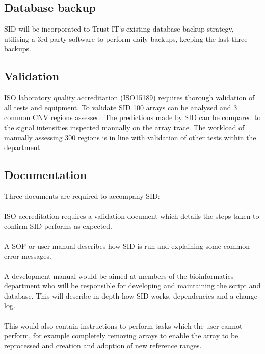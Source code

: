 \subsection{Database backup}
SID will be incorporated to Trust IT`s existing database backup strategy, utilising a 3rd party software to perform daily backups, keeping the last three backups. 

\subsection{Validation}
ISO laboratory quality accreditation (ISO15189) requires thorough validation of all tests and equipment. To validate SID 100 arrays can be analysed and 3 common CNV regions assessed. The predictions made by SID can be compared to the signal intensities inspected manually on the array trace. The workload of manually assessing 300 regions is in line with validation of other tests within the department.

\subsection{Documentation}
Three documents are required to accompany SID:
\paragraph*{}
ISO accreditation requires a validation document which details the steps taken to confirm SID performs as expected.
\paragraph*{}
A SOP or user manual describes how SID is run and explaining some common error messages.
\paragraph*{}
A development manual would be aimed at members of the bioinformatics department who will be responsible for developing and maintaining the script and database. This will describe in depth how SID works, dependencies and a change log. 
\paragraph*{}
This would also contain instructions to perform tasks which the user cannot perform, for example completely removing arrays to enable the array to be reprocessed and creation and adoption of new reference ranges.
